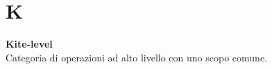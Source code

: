 \section{K}
\textbf{Kite-level}\\
Categoria di operazioni ad alto livello con uno scopo comune.

\clearpage